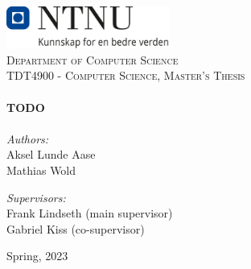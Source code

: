 \begin{titlepage}
\vbox{ }

\vbox{ }

\begin{center}
\includegraphics[width=0.40\textwidth]{figures/NTNU_logo.png}\\[1cm]
\textsc{\LARGE Department of Computer Science}\\[1.5cm]
\textsc{\Large TDT4900 - Computer Science, Master's Thesis}\\[0.5cm]


\vbox{ }
\HRule \\[0.4cm]
{ \huge \bfseries TODO}\\[0.2cm]
\HRule \\[1.5cm]

\large
\emph{Authors:}\\
Aksel Lunde Aase \\
Mathias Wold

\vbox{ }

\vbox{ }

\emph{Supervisors:}\\
Frank Lindseth (main supervisor) \\
Gabriel Kiss (co-supervisor)


\vfill
{\large Spring, 2023}
\end{center}
\end{titlepage}
